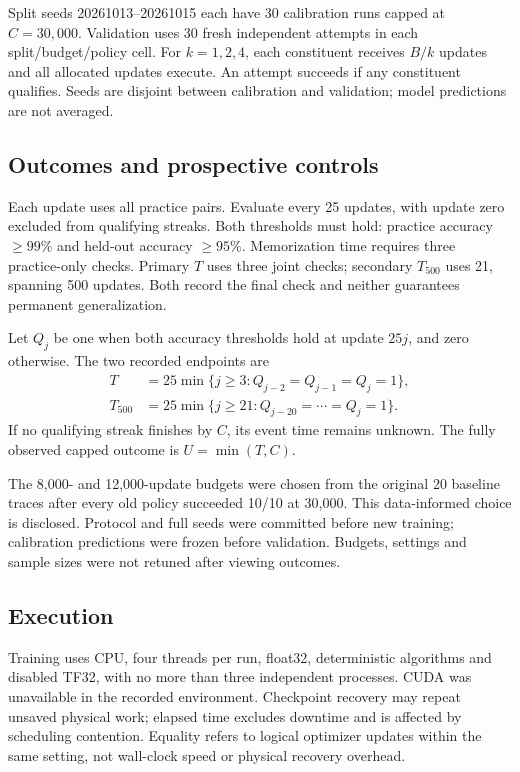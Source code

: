 \documentclass[conference,letterpaper]{IEEEtran}
\begin{document}
Split seeds 20261013--20261015 each have 30 calibration runs capped at $C=30,000$. Validation uses 30 fresh independent attempts in each split/budget/policy cell. For $k=1,2,4$, each constituent receives $B/k$ updates and all allocated updates execute. An attempt succeeds if any constituent qualifies. Seeds are disjoint between calibration and validation; model predictions are not averaged.

\subsection{Outcomes and prospective controls}

Each update uses all practice pairs. Evaluate every 25 updates, with update zero excluded from qualifying streaks. Both thresholds must hold: practice accuracy $\geq99\%$ and held-out accuracy $\geq95\%$. Memorization time requires three practice-only checks. Primary $T$ uses three joint checks; secondary $T_{500}$ uses 21, spanning 500 updates. Both record the final check and neither guarantees permanent generalization.

Let $Q_j$ be one when both accuracy thresholds hold at update $25j$, and zero otherwise. The two recorded endpoints are
\begin{align}
T&=25\min\{j\geq3:Q_{j-2}=Q_{j-1}=Q_j=1\},\\
T_{500}&=25\min\{j\geq21:Q_{j-20}=\cdots=Q_j=1\}.
\end{align}
If no qualifying streak finishes by $C$, its event time remains unknown. The fully observed capped outcome is $U=\min(T,C)$.

The 8,000- and 12,000-update budgets were chosen from the original 20 baseline traces after every old policy succeeded 10/10 at 30,000. This data-informed choice is disclosed. Protocol and full seeds were committed before new training; calibration predictions were frozen before validation. Budgets, settings and sample sizes were not retuned after viewing outcomes.

\subsection{Execution}

Training uses CPU, four threads per run, float32, deterministic algorithms and disabled TF32, with no more than three independent processes. CUDA was unavailable in the recorded environment. Checkpoint recovery may repeat unsaved physical work; elapsed time excludes downtime and is affected by scheduling contention. Equality refers to logical optimizer updates within the same setting, not wall-clock speed or physical recovery overhead.
\end{document}
